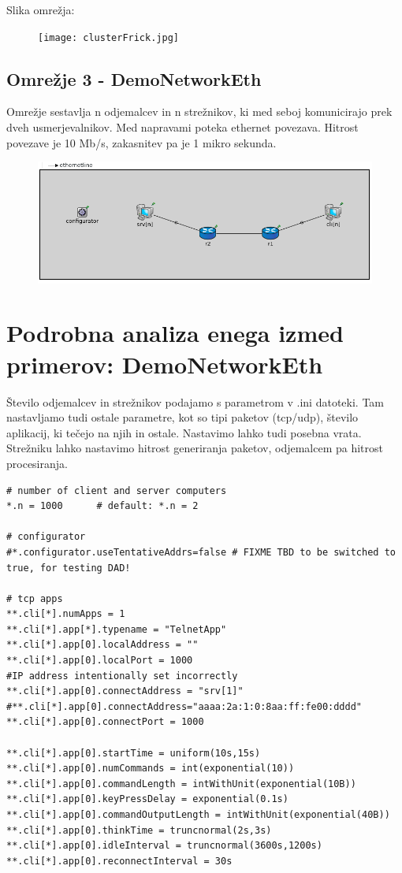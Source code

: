 \documentclass[11pt,a4paper,slovene]{myarticle}
\begin{document}
Slika omrežja:

\begin{figure}[h]
  \texttt{[image: clusterFrick.jpg]}
\end{figure}




\subsection{Omrežje 3 - DemoNetworkEth}
Omrežje sestavlja n odjemalcev in n strežnikov, ki med seboj komunicirajo prek dveh usmerjevalnikov.
Med napravami poteka ethernet povezava. Hitrost povezave je 10 Mb/s, zakasnitev pa je 1 mikro sekunda.

\begin{figure}[h]
  \includegraphics[width=\linewidth]{demonetworketh_struct.png}
\end{figure}



\section{Podrobna analiza enega izmed primerov: DemoNetworkEth}

Število odjemalcev in strežnikov podajamo s parametrom v .ini datoteki. Tam nastavljamo tudi ostale parametre, kot so tipi paketov (tcp/udp), število aplikacij, ki tečejo na njih in ostale.
Nastavimo lahko tudi posebna vrata. Strežniku lahko nastavimo hitrost generiranja paketov, odjemalcem pa hitrost procesiranja.

\begin{lstlisting}
# number of client and server computers
*.n = 1000      # default: *.n = 2

# configurator
#*.configurator.useTentativeAddrs=false # FIXME TBD to be switched to true, for testing DAD!

# tcp apps
**.cli[*].numApps = 1
**.cli[*].app[*].typename = "TelnetApp"
**.cli[*].app[0].localAddress = ""
**.cli[*].app[0].localPort = 1000
#IP address intentionally set incorrectly
**.cli[*].app[0].connectAddress = "srv[1]"
#**.cli[*].app[0].connectAddress="aaaa:2a:1:0:8aa:ff:fe00:dddd"
**.cli[*].app[0].connectPort = 1000

**.cli[*].app[0].startTime = uniform(10s,15s)
**.cli[*].app[0].numCommands = int(exponential(10))
**.cli[*].app[0].commandLength = intWithUnit(exponential(10B))
**.cli[*].app[0].keyPressDelay = exponential(0.1s)
**.cli[*].app[0].commandOutputLength = intWithUnit(exponential(40B))
**.cli[*].app[0].thinkTime = truncnormal(2s,3s)
**.cli[*].app[0].idleInterval = truncnormal(3600s,1200s)
**.cli[*].app[0].reconnectInterval = 30s
\end{lstlisting}
\end{document}
